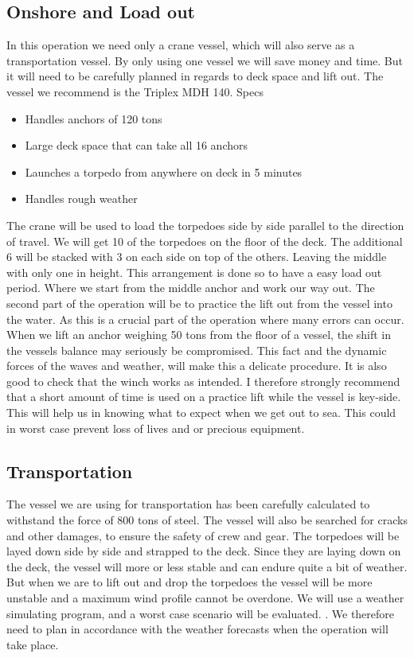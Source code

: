 \documentclass[DIV=calc, paper=a4, fontsize=13pt, twocolumn]{scrartcl}	 %
\begin{document}
\subsection*{Onshore and Load out}
In this operation we need only a crane vessel, which will also serve as a transportation vessel. By only using one vessel we will save money and time. But it will need to be carefully planned in regards to deck space and lift out. The vessel we recommend is the Triplex MDH 140. Specs
\begin{itemize}
\item Handles anchors of 120 tons
\item Large deck space that can take all 16 anchors 
\item Launches a torpedo from anywhere on deck in 5 minutes
\item Handles rough weather
\end{itemize}
The crane will be used to load the torpedoes side by side parallel to the direction of travel. We will get 10 of the torpedoes on the floor of the deck. The additional 6 will be stacked with 3 on each side on top of the others. Leaving the middle with only one in height. This arrangement is done so to have a easy load out period. Where we start from the middle anchor and work our way out. 
\newline
The second part of the operation will be to practice the lift out from the vessel into the water. As this is a crucial part of the operation where many errors can occur. When we lift an anchor weighing 50 tons from the floor of a vessel, the shift in the vessels balance may seriously be compromised. This fact and the dynamic forces of the waves and weather, will make this a delicate procedure. It is also good to check that the winch works as intended. 
\newline
I therefore strongly recommend that a short amount of time is used on a practice lift while the vessel is key-side. This will help us in knowing what to expect when we get out to sea. This could in worst case prevent loss of lives and or precious equipment.



\subsection*{Transportation}
The vessel we are using for transportation has been carefully calculated to withstand the force of 800 tons of steel. The vessel will also be searched for cracks and other damages, to ensure the safety of crew and gear. The torpedoes will be layed down side by side and strapped to the deck. Since they are laying down on the deck, the vessel will more or less stable and can endure quite a bit of weather. But when we are to lift out and drop the torpedoes the vessel will be more unstable and a maximum wind profile cannot be overdone. We will use a weather simulating program, and a worst case scenario will be evaluated. . We therefore need to plan in accordance with the weather forecasts when the operation will take place. 
\end{document}
